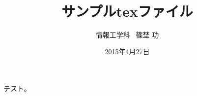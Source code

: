 \documentclass[a4j,12pt]{jarticle}
\title{サンプルtexファイル}
\date{2015年4月27日}
\author{情報工学科 \ 篠埜 功}
\begin{document}
\maketitle

テスト。
\end{document}
